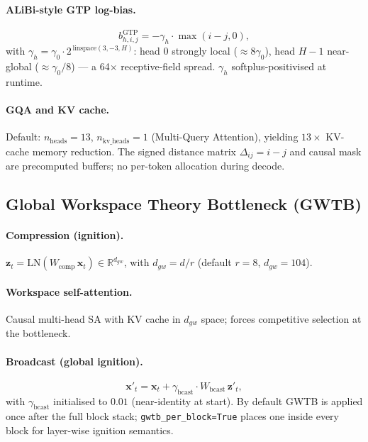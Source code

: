 \documentclass[11pt]{article}
\theoremstyle{definition}
\newcommand{\RR}{\mathbb{R}}
\newcommand{\vx}{\mathbf{x}}
\begin{document}
\paragraph{ALiBi-style GTP log-bias.}
\begin{equation}
  b^\text{GTP}_{h,i,j} = -\gamma_h\cdot\max(i-j,0),
\end{equation}
with $\gamma_h = \gamma_0\cdot 2^{\,\text{linspace}(3,-3,H)}$: head 0 strongly local ($\approx 8\gamma_0$), head $H-1$ near-global ($\approx\gamma_0/8$) — a 64$\times$ receptive-field spread. $\gamma_h$ softplus-positivised at runtime.

\paragraph{GQA and KV cache.}
Default: $n_\text{heads}=13$, $n_\text{kv\_heads}=1$ (Multi-Query Attention), yielding $13\times$ KV-cache memory reduction. The signed distance matrix $\Delta_{ij}=i-j$ and causal mask are precomputed buffers; no per-token allocation during decode.

\subsection{Global Workspace Theory Bottleneck (GWTB)}
\label{sec:gwtb}

\paragraph{Compression (ignition).}
$\mathbf{z}_t = \mathrm{LN}(W_\text{comp}\,\vx_t)\in\RR^{d_{gw}}$, with $d_{gw}=d/r$ (default $r=8$, $d_{gw}=104$).

\paragraph{Workspace self-attention.}
Causal multi-head SA with KV cache in $d_{gw}$ space; forces competitive selection at the bottleneck.

\paragraph{Broadcast (global ignition).}
\begin{equation}
  \vx'_t = \vx_t + \gamma_\text{bcast}\cdot W_\text{bcast}\,\mathbf{z}'_t,
\end{equation}
with $\gamma_\text{bcast}$ initialised to $0.01$ (near-identity at start). By default GWTB is applied once after the full block stack; \texttt{gwtb\_per\_block=True} places one inside every block for layer-wise ignition semantics.
\end{document}
